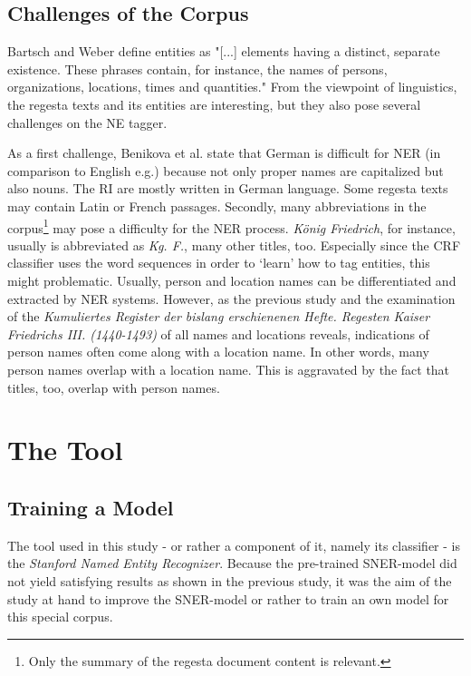\documentclass[11pt,a4paper]{article}
\begin{document}
\subsection{Challenges of the Corpus}
Bartsch and Weber \cite{bartsch_linguisticsweb:tutorials:linguistics_tutorials:automaticannotation:stanford_ner_2015} define entities as "[...] elements having a distinct, separate existence. These phrases contain, for instance, the names of persons, organizations, locations, times and quantities." From the viewpoint of linguistics, the regesta texts and its entities are interesting, but they also pose several challenges on the NE tagger.

As a first challenge, Benikova et al. \cite{benikova_nosta-d_nodate} state that German is difficult for NER (in comparison to English e.g.) because not only proper names are capitalized but also nouns. The RI are mostly written in German language. Some regesta texts may contain Latin or French passages. Secondly, many abbreviations in the corpus\footnote{Only the summary of the regesta document content is relevant.} may pose a difficulty for the NER process. \textit{König Friedrich}, for instance, usually is abbreviated as \textit{Kg. F.}, many other titles, too. Especially since the CRF classifier uses the word sequences in order to ‘learn’ how to tag entities, this might problematic. Usually, person and location names can be differentiated and extracted by NER systems. However, as the previous study and the examination of the \textit{Kumuliertes Register der bislang erschienenen Hefte. Regesten Kaiser Friedrichs III. (1440-1493)} \cite{rubsamen_accumulated_nodate} of all names and locations reveals, indications of person names often come along with a location name. In other words, many person names overlap with a location name. This is aggravated by the fact that titles, too, overlap with person names.

\section{The Tool}
\label{cha:tool}
\subsection{Training a Model}
The tool used in this study - or rather a component of it, namely its classifier - is the \textit{Stanford Named Entity Recognizer}. Because the pre-trained SNER-model did not yield satisfying results as shown in the previous study, it was the aim of the study at hand to improve the SNER-model or rather to train an own model for this special corpus.
\end{document}

